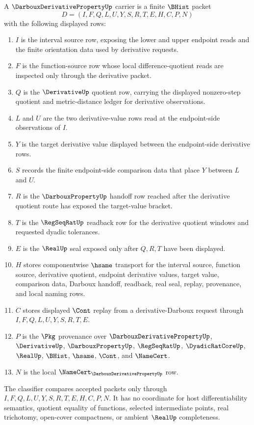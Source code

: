 \begin{definition}
\label{def:darboux-derivative-property-carrier}
A $\DarbouxDerivativePropertyUp$ carrier is a finite $\BHist$ packet
$$
D=(I,F,Q,L,U,Y,S,R,T,E,H,C,P,N)
$$
with the following displayed rows:
\begin{enumerate}
\item $I$ is the interval source row, exposing the lower and upper endpoint reads and the finite orientation data used by derivative requests.
\item $F$ is the function-source row whose local difference-quotient reads are inspected only through the derivative packet.
\item $Q$ is the $\DerivativeUp$ quotient row, carrying the displayed nonzero-step quotient and metric-distance ledger for derivative observations.
\item $L$ and $U$ are the two derivative-value rows read at the endpoint-side observations of $I$.
\item $Y$ is the target derivative value displayed between the endpoint-side derivative rows.
\item $S$ records the finite endpoint-side comparison data that place $Y$ between $L$ and $U$.
\item $R$ is the $\DarbouxPropertyUp$ handoff row reached after the derivative quotient route has exposed the target-value bracket.
\item $T$ is the $\RegSeqRatUp$ readback row for the derivative quotient windows and requested dyadic tolerances.
\item $E$ is the $\RealUp$ seal exposed only after $Q,R,T$ have been displayed.
\item $H$ stores componentwise $\hsame$ transport for the interval source, function source, derivative quotient, endpoint derivative values, target value, comparison data, Darboux handoff, readback, real seal, replay, provenance, and local naming rows.
\item $C$ stores displayed $\Cont$ replay from a derivative-Darboux request through $I,F,Q,L,U,Y,S,R,T,E$.
\item $P$ is the $\Pkg$ provenance over $\DarbouxDerivativePropertyUp$, $\DerivativeUp$, $\DarbouxPropertyUp$, $\RegSeqRatUp$, $\DyadicRatCoreUp$, $\RealUp$, $\BHist$, $\hsame$, $\Cont$, and $\NameCert$.
\item $N$ is the local $\NameCert_{\DarbouxDerivativePropertyUp}$ row.
\end{enumerate}
The classifier compares accepted packets only through $I,F,Q,L,U,Y,S,R,T,E,H,C,P,N$. It has no coordinate for host differentiability semantics, quotient equality of functions, selected intermediate points, real trichotomy, open-cover compactness, or ambient $\RealUp$ completeness.
\end{definition}

